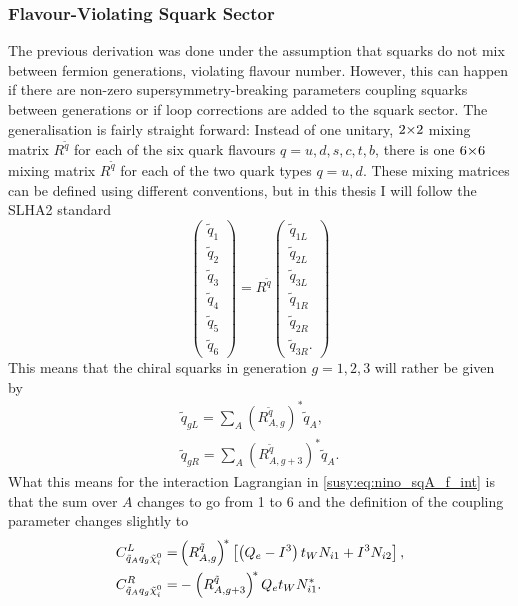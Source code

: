 \documentclass[../main.tex]{subfiles}
\begin{document}
\subsubsection*{Flavour-Violating Squark Sector}
The previous derivation was done under the assumption that squarks do not mix between fermion generations, violating flavour number.
However, this can happen if there are non-zero supersymmetry-breaking parameters coupling squarks between generations or if loop corrections are added to the squark sector.
The generalisation is fairly straight forward: Instead of one unitary, \(2 {\times} 2\) mixing matrix \(R^{\tilde{q}}\) for each of the six quark flavours \(q = u, d, s, c, t, b\), there is one \(6 {\times} 6\) mixing matrix \(R^{\tilde{q}}\) for each of the two quark types \(q = u, d\).
These mixing matrices can be defined using different conventions, but in this thesis I will follow the SLHA2 standard~\cite{SLHA2}
\begin{equation}
  \begin{pmatrix}
    \tilde{q}_1 \\ \tilde{q}_2 \\ \tilde{q}_3 \\ \tilde{q}_4 \\ \tilde{q}_5 \\ \tilde{q}_6
  \end{pmatrix}
  = R^{\tilde{q}} \begin{pmatrix}
    \tilde{q}_{1L} \\ \tilde{q}_{2L} \\ \tilde{q}_{3L} \\ \tilde{q}_{1R} \\ \tilde{q}_{2R} \\ \tilde{q}_{3R}.
  \end{pmatrix}
\end{equation}
This means that the chiral squarks in generation \(g = 1,2,3\) will rather be given by
\begin{subequations}
  \begin{align}
    \tilde{q}_{gL} = \sum_A (R^{\tilde{q}}_{A,g})^\ast \tilde{q}_A, \\
    \tilde{q}_{gR} = \sum_A (R^{\tilde{q}}_{A,g+3})^\ast \tilde{q}_A.
  \end{align}
\end{subequations}
What this means for the interaction Lagrangian in \cref{susy:eq:nino_sqA_f_int} is that the sum over \(A\) changes to go from 1 to 6 and the definition of the coupling parameter changes slightly to
\begin{subequations}
  \begin{align}
    C_{\tilde{q}_A q_g \tilde{\chi}_i^0}^{L} = & \left(R^{\tilde{q}}_{A,g}\right)^{\!\ast} \left[\left(Q_e-I^3\right)t_W N_{i1} + I^3 N_{i2}\right], \\
    C_{\tilde{q}_A q_g \tilde{\chi}_i^0}^{R} = & -\left(R^{\tilde{q}}_{A,g+3}\right)^{\!\ast} Q_e t_W N_{i1}^\ast.
  \end{align}
\end{subequations}
\end{document}
